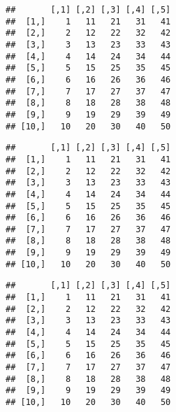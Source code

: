 \documentclass[paper=a4,headsepline,BCOR=12mm,twoside,open=right,%
titlepage,headings=small,fontsize=10pt,index=totoc,bibliography=totoc,%
captions=tableheading,captions=nooneline]{scrbook}\usepackage{knitr}
\begin{document}
\begin{knitrout}\footnotesize
{}\color{fgcolor}\begin{kframe}
\begin{alltt}
 \hlkwb{<-} \hlstd{(}\hlopt{:}\hlstd{,} \hlstd{)}
\end{alltt}
\begin{verbatim}
##       [,1] [,2] [,3] [,4] [,5]
##  [1,]    1   11   21   31   41
##  [2,]    2   12   22   32   42
##  [3,]    3   13   23   33   43
##  [4,]    4   14   24   34   44
##  [5,]    5   15   25   35   45
##  [6,]    6   16   26   36   46
##  [7,]    7   17   27   37   47
##  [8,]    8   18   28   38   48
##  [9,]    9   19   29   39   49
## [10,]   10   20   30   40   50
\end{verbatim}
\begin{alltt}
 \hlkwb{<-} \hlstd{(}\hlopt{:}\hlstd{,} \hlstd{,} \hlstd{)}
\end{alltt}
\begin{verbatim}
##       [,1] [,2] [,3] [,4] [,5]
##  [1,]    1   11   21   31   41
##  [2,]    2   12   22   32   42
##  [3,]    3   13   23   33   43
##  [4,]    4   14   24   34   44
##  [5,]    5   15   25   35   45
##  [6,]    6   16   26   36   46
##  [7,]    7   17   27   37   47
##  [8,]    8   18   28   38   48
##  [9,]    9   19   29   39   49
## [10,]   10   20   30   40   50
\end{verbatim}
\begin{alltt}
 \hlkwb{<-} \hlstd{(}\hlopt{:}\hlstd{,}  \hlstd{=} \hlstd{)}
\end{alltt}
\begin{verbatim}
##       [,1] [,2] [,3] [,4] [,5]
##  [1,]    1   11   21   31   41
##  [2,]    2   12   22   32   42
##  [3,]    3   13   23   33   43
##  [4,]    4   14   24   34   44
##  [5,]    5   15   25   35   45
##  [6,]    6   16   26   36   46
##  [7,]    7   17   27   37   47
##  [8,]    8   18   28   38   48
##  [9,]    9   19   29   39   49
## [10,]   10   20   30   40   50
\end{verbatim}
\begin{alltt}
 \hlkwb{<-} \hlstd{(}\hlopt{:}\hlstd{,}  \hlstd{=} \hlstd{)}
\end{alltt}

\end{kframe}
\end{knitrout}
\end{document}
